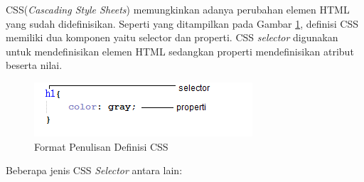 CSS(\textit{Cascading Style Sheets}) memungkinkan adanya perubahan elemen HTML yang sudah didefinisikan\cite{Meyer:2012}. Seperti yang ditampilkan pada Gambar \ref{fig:2_selector_ex}, definisi CSS memiliki dua komponen yaitu selector dan properti. CSS \textit{selector} digunakan untuk mendefinisikan elemen HTML sedangkan properti mendefinisikan atribut beserta nilai. 
		\begin{figure}[H]
			\centering
			\includegraphics[scale=0.8]{Gambar/selector-ex}
			\caption{Format Penulisan Definisi CSS} 
			\label{fig:2_selector_ex}
		\end{figure}
Beberapa jenis CSS \textit{Selector} antara lain:

